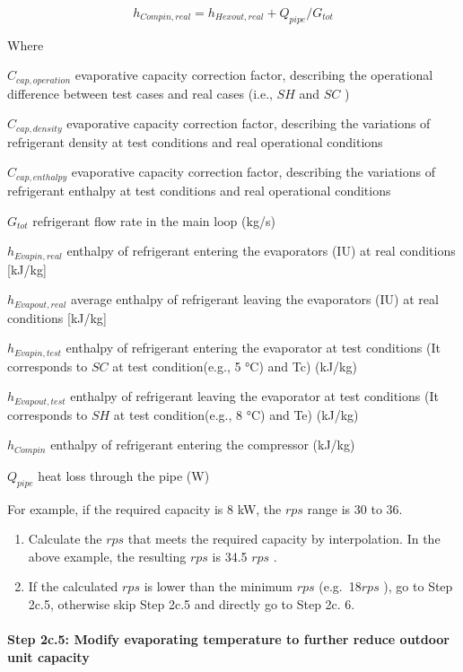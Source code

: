 \begin{equation}
h_{Compin,real} = h_{Hexout,real}+Q_{pipe}/G_{tot}
\end{equation}

Where

\(C_{cap,operation}\) evaporative capacity correction factor, describing the operational difference between test cases and real cases (i.e., \(SH\) and \(SC\) )

\(C_{cap,density}\) evaporative capacity correction factor, describing the variations of refrigerant density at test conditions and real operational conditions

\(C_{cap,enthalpy}\) evaporative capacity correction factor, describing the variations of refrigerant enthalpy at test conditions and real operational conditions

\(G_{tot}\) refrigerant flow rate in the main loop (kg/s)

\(h_{Evapin,real}\) enthalpy of refrigerant entering the evaporators (IU) at real conditions {[}kJ/kg{]}

\(h_{Evapout,real}\) average enthalpy of refrigerant leaving the evaporators (IU) at real conditions {[}kJ/kg{]}

\(h_{Evapin,test}\) enthalpy of refrigerant entering the evaporator at test conditions (It corresponds to \(SC\) at test condition(e.g., 5 °C) and Tc) (kJ/kg)

\(h_{Evapout,test}\) enthalpy of refrigerant leaving the evaporator at test conditions (It corresponds to \(SH\) at test condition(e.g., 8 °C) and Te) (kJ/kg)

\(h_{Compin}\) enthalpy of refrigerant entering the compressor (kJ/kg)

\(Q_{pipe}\) heat loss through the pipe (W)

For example, if the required capacity is 8 kW, the \(rps\) range is 30 to 36.

\begin{enumerate}
\def\labelenumi{\alph{enumi}.}
\setcounter{enumi}{2}
\item
  Calculate the \(rps\) that meets the required capacity by interpolation. In the above example, the resulting \(rps\) is 34.5 \(rps\) .
\item
  If the calculated \(rps\) is lower than the minimum \(rps\) (e.g.~18\(rps\) ), go to Step 2c.5, otherwise skip Step 2c.5 and directly go to Step 2c. 6.
\end{enumerate}

\paragraph{Step 2c.5: Modify evaporating temperature to further reduce outdoor unit capacity}\label{step-2c.5-modify-evaporating-temperature-to-further-reduce-outdoor-unit-capacity}

